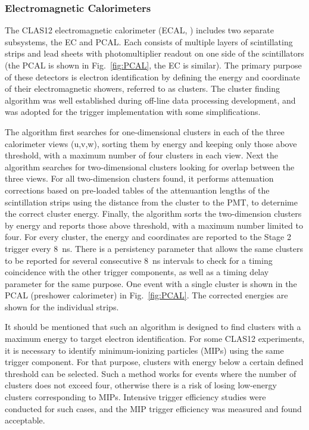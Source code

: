 \subsubsection{Electromagnetic Calorimeters}
\label{sec:ECAL}

The CLAS12 electromagnetic calorimeter (ECAL, \cite{ec-ref}) includes two separate subsystems, the EC and PCAL. Each consists of multiple layers of scintillating strips and lead sheets with photomultiplier readout on one side of the scintillators (the PCAL is shown in Fig.~\ref{fig:PCAL}, the EC is similar). The primary purpose of these detectors is electron identification by defining the energy and coordinate of their electromagnetic showers, referred to as clusters. The cluster finding algorithm was well established during off-line data processing development, and was adopted for the trigger implementation with some simplifications.

The algorithm first searches for one-dimensional clusters in each of the three calorimeter views (u,v,w), sorting them by energy and keeping only those above threshold, with a maximum number of four clusters in each view. Next the algorithm searches for two-dimensional clusters looking for overlap between the three views. For all two-dimension clusters found, it performs attenuation corrections based on pre-loaded tables of the attenuantion lengths of the scintillation strips using the distance from the cluster to the PMT, to deternime the correct cluster energy. Finally, the algorithm sorts the two-dimension clusters by energy and reports those above threshold, with a maximum number limited to four. For every cluster, the energy and coordinates are reported to the Stage 2 trigger every 8~ns. There is a persistency parameter that allows the same clusters to be reported for several consecutive 8~ns intervals to check for a timing coincidence with the other trigger components, as well as a timing delay parameter for the same purpose. One event with a single cluster is shown in the PCAL (preshower calorimeter) in Fig.~\ref{fig:PCAL}. The corrected energies are shown for the individual strips.

It should be mentioned that such an algorithm is designed to find clusters with a maximum energy to target electron identification. For some CLAS12 experiments, it is necessary to identify minimum-ionizing particles (MIPs) using the same trigger component. For that purpose, clusters with energy below a certain defined threshold can be selected. Such a method works for events where the number of clusters does not exceed four, otherwise there is a risk of losing low-energy clusters corresponding to MIPs. Intensive trigger efficiency studies were conducted for such cases, and the MIP trigger efficiency was measured and found acceptable.

